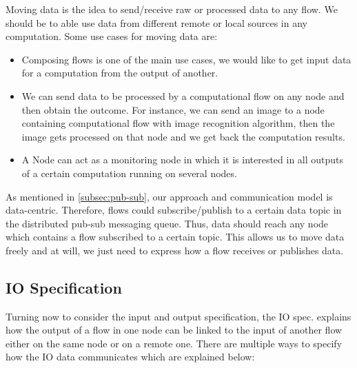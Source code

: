 Moving data is the idea  to send/receive raw or processed data to any flow. We should be to able use data from different remote or local sources in any computation. Some use cases for moving data are:
\begin{itemize}
\item Composing flows is one of the main use cases, we would like to get input data for a computation from the output of another.

\item We can send data to be processed by a computational flow on any node and then obtain the outcome. For instance, we can send an image to a node containing computational flow with image recognition algorithm, then the image gets processed on that node and we get back the computation results. 

\item A Node can act as a monitoring node in which it is interested in all outputs of a certain computation running on several nodes.

\end{itemize} 
 As mentioned in \ref{subsec:pub-sub}, our approach and communication model is data-centric. Therefore, flows could subscribe/publish to a certain data topic in the distributed pub-sub messaging queue. Thus, data should reach any node which contains a flow subscribed to a certain topic. This allows us to move data freely and at will, we just need to express how a flow receives or publishes data.

\subsection{IO Specification}
Turning now to consider the input and output specification, the IO spec. explains how the output of a flow in one node can be linked to the input of another flow either on the same node or on a remote one. There are multiple ways to specify how the IO data communicates which are explained below:


